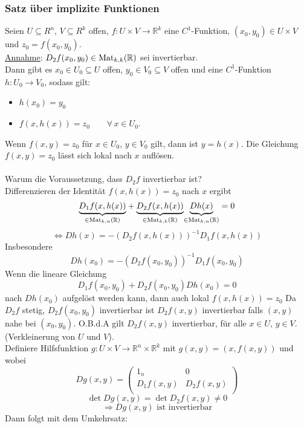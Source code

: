 \subsubsection{Satz über implizite Funktionen} %
\label{implfunkt}
 Seien $U \subseteq R^n$, $V \subseteq R^k$ offen, $f:U \times V \to \mathbb{R}^k$ eine $C^1$-Funktion, $(x_0,y_0) \in U \times V$ und $z_0 = f(x_0,y_0)$. \\
 \underline{Annahme}: $D_2f(x_0,y_0) \in \operatorname{Mat}_{k,k}(\mathbb{R})$ sei invertierbar. \\
 Dann gibt es $x_0 \in U_0 \subseteq U$ offen, $y_0 \in V_0 \subseteq V$ offen und eine $C^1$-Funktion $h: U_0 \to V_0$, sodass gilt:
 \begin{itemize}
 	\item $h(x_0)=y_0$
	\item $f(x,h(x))=z_0 \qquad \forall\, x \in U_0$.
 \end{itemize}
 Wenn $f(x,y)=z_0$ für $x \in U_0$, $y \in V_0$ gilt, dann ist $y=h(x)$.
Die Gleichung $f(x,y)=z_0$ lässt sich lokal nach $x$ auflösen. \\
\\
Warum die Voraussetzung, dass $D_2f$ invertierbar ist? \\
Differenzieren der Identität $f(x,h(x))=z_0$ nach $x$ ergibt
\[
	\underset{\in \operatorname{Mat}_{k,n}(\mathbb{R})}{\underbrace{D_1f(x,h(x))}}+ \underset{\in \operatorname{Mat}_{k,k}(\mathbb{R})}{\underbrace{D_2f(x,h(x))}}\underset{\in \operatorname{Mat}_{k,n}(\mathbb{R})}{\underbrace{Dh(x)}} = 0 
\]
\[
	\Leftrightarrow Dh(x) = - (D_2f(x,h(x)))^{-1}D_1f(x,h(x))
\]
Insbesondere 
\[
	Dh(x_0)= -(D_2f(x_0,y_0))^{-1} D_1f(x_0,y_0)
\]
Wenn die lineare Gleichung
\[
	D_1f(x_0,y_0)+D_2f(x_0,y_0)Dh(x_0)=0
\]
nach $Dh(x_0)$ aufgelöst werden kann, dann auch lokal $f(x,h(x))=z_0$
Da $D_2f$ stetig, $D_2f(x_0,y_0)$ invertierbar ist $D_2f(x,y)$ invertierbar falls $(x,y)$ nahe bei $(x_0,y_0)$. O.B.d.A gilt $D_2f(x,y)$ invertierbar, für alle $x \in U$, $y \in V$. (Verkleinerung von $U$ und $V$). \\
Definiere Hilfsfunktion $g: U \times V \to \mathbb{R}^n \times \mathbb{R}^k$ mit $g(x,y)=(x,f(x,y))$ und wobei
\[
	Dg(x,y)= \begin{pmatrix}
	 1_n & 0  \\
	 D_1f(x,y) & D_2f(x,y) \\
	 	\end{pmatrix}
\] 
\[
	\det Dg(x,y) = \det D_2f(x,y) \neq 0
\]
\[
	\Rightarrow Dg(x,y) \text{ ist invertierbar}
\]
Dann folgt mit dem Umkehrsatz:
